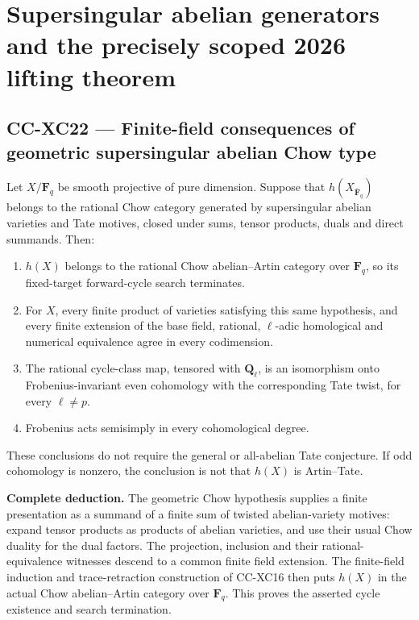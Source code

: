 \section{Supersingular abelian generators and the precisely scoped 2026
lifting
theorem}\label{supersingular-abelian-generators-and-the-precisely-scoped-2026-lifting-theorem}

\subsection{CC-XC22 --- Finite-field consequences of geometric
supersingular abelian Chow
type}\label{cc-xc22-finite-field-consequences-of-geometric-supersingular-abelian-chow-type}

Let \(X/\mathbf F_q\) be smooth projective of pure dimension. Suppose
that \(h(X_{\bar{\mathbf F}_q})\) belongs to the rational Chow category
generated by supersingular abelian varieties and Tate motives, closed
under sums, tensor products, duals and direct summands. Then:

\begin{enumerate}
\def\labelenumi{\arabic{enumi}.}
\tightlist
\item
  \(h(X)\) belongs to the rational Chow abelian--Artin category over
  \(\mathbf F_q\), so its fixed-target forward-cycle search terminates.
\item
  For \(X\), every finite product of varieties satisfying this same
  hypothesis, and every finite extension of the base field, rational,
  \(\ell\)-adic homological and numerical equivalence agree in every
  codimension.
\item
  The rational cycle-class map, tensored with \(\mathbf Q_\ell\), is an
  isomorphism onto Frobenius-invariant even cohomology with the
  corresponding Tate twist, for every \(\ell\ne p\).
\item
  Frobenius acts semisimply in every cohomological degree.
\end{enumerate}

These conclusions do not require the general or all-abelian Tate
conjecture. If odd cohomology is nonzero, the conclusion is not that
\(h(X)\) is Artin--Tate.

\textbf{Complete deduction.} The geometric Chow hypothesis supplies a
finite presentation as a summand of a finite sum of twisted
abelian-variety motives: expand tensor products as products of abelian
varieties, and use their usual Chow duality for the dual factors. The
projection, inclusion and their rational-equivalence witnesses descend
to a common finite field extension. The finite-field induction and
trace-retraction construction of CC-XC16 then puts \(h(X)\) in the
actual Chow abelian--Artin category over \(\mathbf F_q\). This proves
the asserted cycle existence and search termination.


